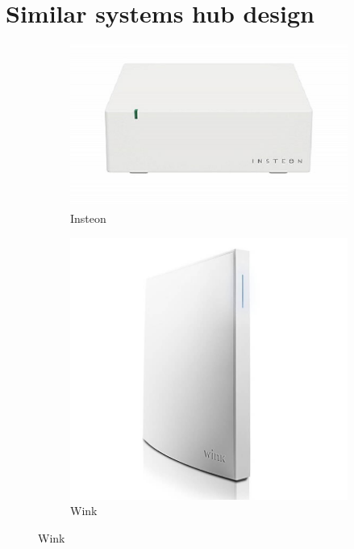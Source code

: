 \documentclass[12pt]{paper}
\begin{document}
		\section{Similar systems hub design}
		\label{appendix:similar_system_comparision}
		\begin{figure}[H]
			\begin{subfigure}[b]{.5\linewidth}
				\includegraphics[width=\linewidth]{img/insteon_hw.png}
				\caption{Insteon}
			\end{subfigure}
			\begin{subfigure}[b]{.5\linewidth}
				\includegraphics[width=\linewidth]{img/wink_hw.png}
				\caption{Wink}
			\end{subfigure}

\end{figure}
\end{document}
